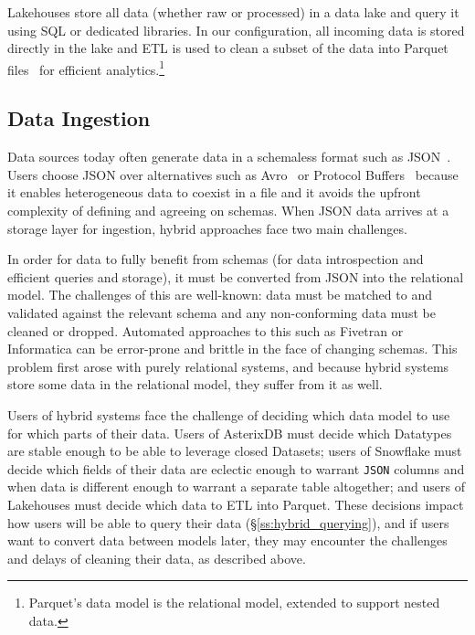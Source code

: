  Lakehouses store all data (whether raw or processed) in a data lake and query it using SQL or dedicated libraries. In our configuration, all incoming data is stored directly in the lake and ETL is used to clean a subset of the data into Parquet files~\cite{parquet} for efficient analytics.\footnote{Parquet's data model is the relational model, extended to support nested data.}

\vspace{-0.7em}
\subsection{Data Ingestion} \label{ss:hybrid_ingestion}

Data sources today often generate data in a schemaless format such as JSON~\cite{json}. Users choose JSON over alternatives such as Avro~\cite{avro} or Protocol Buffers~\cite{protobufs} because it enables heterogeneous data to coexist in a file and it avoids the upfront complexity of defining and agreeing on schemas. When JSON data arrives at a storage layer for ingestion, hybrid approaches face two main challenges.

 In order for data to fully benefit from schemas (for data introspection and efficient queries and storage), it must be converted from JSON into the relational model. The challenges of this are well-known: data must be matched to and validated against the relevant schema and any non-conforming data must be cleaned or dropped. Automated approaches to this such as Fivetran or Informatica can be error-prone and brittle in the face of changing schemas.
This problem first arose with purely relational systems, and because hybrid systems store some data in the relational model, they suffer from it as well.

 Users of hybrid systems face the challenge of deciding which data model to use for which parts of their data. Users of AsterixDB must decide which Datatypes are stable enough to be able to leverage closed Datasets; users of Snowflake must decide which fields of their data are eclectic enough to warrant \texttt{JSON} columns and when data is different enough to warrant a separate table altogether; and users of Lakehouses must decide which data to ETL into Parquet. These decisions impact how users will be able to query their data (\S\ref{ss:hybrid_querying}), and
if users want to convert data between models later, they may encounter the challenges and delays of cleaning their data, as described above.

